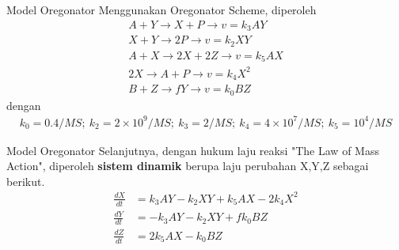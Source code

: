 \documentclass[aspectratio=169]{beamer}
\begin{document}
\begin{frame}{Model Oregonator}
    Menggunakan Oregonator Scheme, diperoleh
    \begin{align*}
        A+Y \to X + P \to v = k_3 AY\\
        X + Y \to 2P \to v = k_2 XY\\
        A + X \to 2X + 2Z \to v = k_5 AX\\
        2X \to A + P \to v = k_4 X^2\\
        B + Z \to fY \to v = k_0 BZ
    \end{align*}
    dengan 
    \begin{align*}
        k_0 = 0.4/MS; \ k_2 = 2 \times 10^9/MS; \ k_3 = 2/MS; \ k_4 = 4 \times 10^7/MS; \ k_5 = 10^4/MS
    \end{align*}
\end{frame}

\begin{frame}{Model Oregonator}
    Selanjutnya, dengan hukum laju reaksi "The Law of Mass Action", diperoleh \textbf{sistem dinamik} berupa laju perubahan X,Y,Z sebagai berikut.
    \begin{align*}
        \frac{dX}{dt} &= k_3 AY - k_2 XY + k_5 AX - 2k_4 X^2\\
        \frac{dY}{dt} &= -k_3 AY - k_2 XY + fk_0 BZ\\
        \frac{dZ}{dt} &= 2k_5 AX - k_0 BZ
    \end{align*}
\end{frame}


\end{document}
